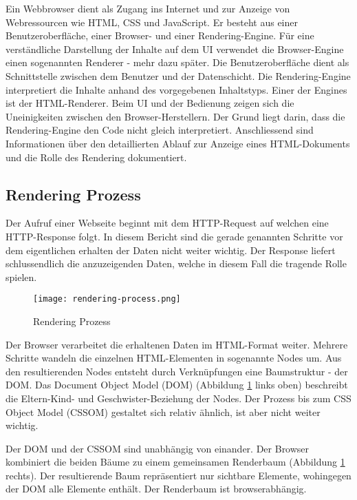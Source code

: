 Ein Webbrowser dient als Zugang ins Internet und zur Anzeige von Webressourcen wie HTML, CSS und JavaScript. 
Er besteht aus einer Benutzeroberfläche, einer Browser- und einer Rendering-Engine. 
Für eine verständliche Darstellung der Inhalte auf dem UI verwendet die Browser-Engine einen sogenannten Renderer - mehr dazu später. 
Die Benutzeroberfläche dient als Schnittstelle zwischen dem Benutzer und der Datenschicht. 
Die Rendering-Engine interpretiert die Inhalte anhand des vorgegebenen Inhaltstyps. 
Einer der Engines ist der HTML-Renderer. 
Beim UI und der Bedienung zeigen sich die Uneinigkeiten zwischen den Browser-Herstellern. 
Der Grund liegt darin, dass die Rendering-Engine den Code nicht gleich interpretiert. 
Anschliessend sind Informationen über den detaillierten Ablauf zur Anzeige eines HTML-Dokuments und die Rolle des Rendering dokumentiert. 


\subsection{Rendering Prozess}
\label{sec:structureRendering}

Der Aufruf einer Webseite beginnt mit dem HTTP-Request auf welchen eine HTTP-Response folgt. 
In diesem Bericht sind die gerade genannten Schritte vor dem eigentlichen erhalten der Daten nicht weiter wichtig. 
Der Response liefert schlussendlich die anzuzeigenden Daten, welche in diesem Fall die tragende Rolle spielen. 

\begin{figure}[!htb]
    \centering
    \texttt{[image: rendering-process.png]}
    \caption{\centering Rendering Prozess}
    \label{img:renderingProcess}
\end{figure}

Der Browser verarbeitet die erhaltenen Daten im HTML-Format weiter. 
Mehrere Schritte wandeln die einzelnen HTML-Elementen in sogenannte Nodes um. 
Aus den resultierenden Nodes entsteht durch Verknüpfungen eine Baumstruktur - der DOM. 
Das Document Object Model (DOM) (Abbildung \ref{img:renderingProcess} links oben) beschreibt die Eltern-Kind- und Geschwister-Beziehung der Nodes. 
Der Prozess bis zum CSS Object Model (CSSOM) gestaltet sich relativ ähnlich, ist aber nicht weiter wichtig. 

Der DOM und der CSSOM sind unabhängig von einander. 
Der Browser kombiniert die beiden Bäume zu einem gemeinsamen Renderbaum (Abbildung \ref{img:renderingProcess} rechts). 
Der resultierende Baum repräsentiert nur sichtbare Elemente, wohingegen der DOM alle Elemente enthält. 
Der Renderbaum ist browserabhängig. 


